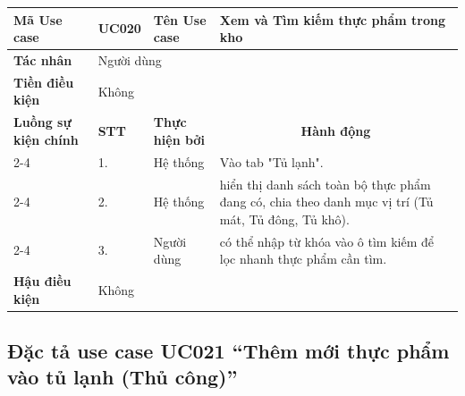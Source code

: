 \documentclass[../main.tex]{subfiles}
\begin{document}
\begin{longtable}{|p{2.7cm}|p{0.8cm}|p{2.6cm}|p{7.3cm}|}
\hline
\cellcolor[HTML]{D5F5E3}\textbf{Mã Use case} & \multicolumn{1}{l|}{UC020} & \cellcolor[HTML]{D5F5E3}\textbf{Tên Use case} & Xem và Tìm kiếm thực phẩm trong kho \\ \hline
\cellcolor[HTML]{D5F5E3}\textbf{Tác nhân} & \multicolumn{3}{p{10.7cm}|}{Người dùng} \\ \hline
\cellcolor[HTML]{D5F5E3}\textbf{Tiền điều kiện} & \multicolumn{3}{p{10.7cm}|}{Không} \\ \hline

\cellcolor[HTML]{D5F5E3}\textbf{Luồng sự kiện chính} & \cellcolor[HTML]{FDEBD0}\textbf{STT} & \cellcolor[HTML]{FDEBD0}\textbf{Thực hiện bởi} & \multicolumn{1}{c|}{\cellcolor[HTML]{FDEBD0}\textbf{Hành động}} \\ \cline{2-4} 
\cellcolor[HTML]{D5F5E3} & 1. & Hệ thống & Vào tab "Tủ lạnh". \\ \cline{2-4} 
\cellcolor[HTML]{D5F5E3} & 2. & Hệ thống & hiển thị danh sách toàn bộ thực phẩm đang có, chia theo danh mục vị trí (Tủ mát, Tủ đông, Tủ khô). \\ \cline{2-4} 
\cellcolor[HTML]{D5F5E3} & 3. & Người dùng & có thể nhập từ khóa vào ô tìm kiếm để lọc nhanh thực phẩm cần tìm. \\ \hline

\cellcolor[HTML]{D5F5E3}\textbf{Hậu điều kiện} & \multicolumn{3}{p{10.7cm}|}{Không} \\ \hline
\end{longtable}
\endgroup

\subsection{Đặc tả use case UC021 ``Thêm mới thực phẩm vào tủ lạnh (Thủ công)''}
\vspace{0.5cm}

\begingroup
\renewcommand{\arraystretch}{1.5}
\end{document}
